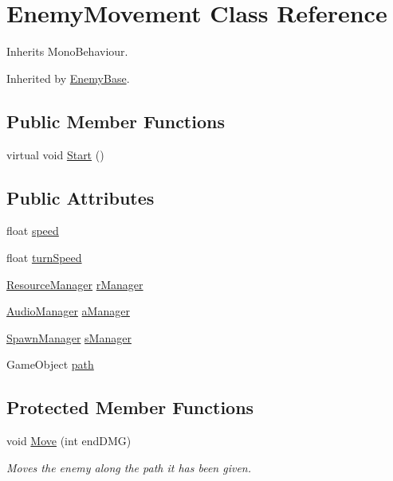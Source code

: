 \hypertarget{class_enemy_movement}{}\section{Enemy\+Movement Class Reference}
\label{class_enemy_movement}


Inherits Mono\+Behaviour.



Inherited by \hyperlink{class_enemy_base}{Enemy\+Base}.

\subsection*{Public Member Functions}
\begin{DoxyCompactItemize}
\item 
virtual void \hyperlink{class_enemy_movement_a69cfde4faddeed6aa261b7ceeb8173f7}{Start} ()
\end{DoxyCompactItemize}
\subsection*{Public Attributes}
\begin{DoxyCompactItemize}
\item 
float \hyperlink{class_enemy_movement_a10af9877c4abb972cfecbc3e284e742d}{speed}
\item 
float \hyperlink{class_enemy_movement_aae88c55b04b5126ab249117397f247d2}{turn\+Speed}
\item 
\hyperlink{class_resource_manager}{Resource\+Manager} \hyperlink{class_enemy_movement_aec30ae034cbc598254ec67380e388ed2}{r\+Manager}
\item 
\hyperlink{class_audio_manager}{Audio\+Manager} \hyperlink{class_enemy_movement_a0b8c3e8a377c26d00bf8b0844a58ac55}{a\+Manager}
\item 
\hyperlink{class_spawn_manager}{Spawn\+Manager} \hyperlink{class_enemy_movement_aefd26d9ba8e601679eb4ca36476a8d91}{s\+Manager}
\item 
Game\+Object \hyperlink{class_enemy_movement_a58d4160c001cb5df52739e2f0854ee33}{path}
\end{DoxyCompactItemize}
\subsection*{Protected Member Functions}
\begin{DoxyCompactItemize}
\item 
void \hyperlink{class_enemy_movement_a240107ee807b4a67f68bb7ae116e0160}{Move} (int end\+D\+MG)
\begin{DoxyCompactList}\small\item\em Moves the enemy along the path it has been given. \end{DoxyCompactList}\end{DoxyCompactItemize}
